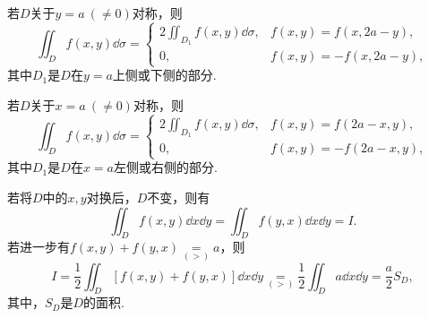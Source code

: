 若\(D\)关于\(y=a\ (\neq0)\)对称，则\begin{equation*}
	\iint_D f(x,y) \dd{\sigma}
	= \left\{ \begin{array}{cc}
		2 \iint_{D_1} f(x,y) \dd{\sigma}, & f(x,y) = f(x,2a-y), \\
		0, & f(x,y) = -f(x,2a-y),
	\end{array} \right.
\end{equation*}
其中\(D_1\)是\(D\)在\(y=a\)上侧或下侧的部分.

若\(D\)关于\(x=a\ (\neq0)\)对称，则\begin{equation*}
	\iint_D f(x,y) \dd{\sigma}
	= \left\{ \begin{array}{cc}
		2 \iint_{D_1} f(x,y) \dd{\sigma}, & f(x,y) = f(2a-x,y), \\
		0, & f(x,y) = -f(2a-x,y),
	\end{array} \right.
\end{equation*}
其中\(D_1\)是\(D\)在\(x=a\)左侧或右侧的部分.

\def\op{\underset{(>)}{=}}
若将\(D\)中的\(x,y\)对换后，\(D\)不变，则有\begin{equation*}
	\iint_D f(x,y) \dd{x}\dd{y} = \iint_D f(y,x) \dd{x}\dd{y} = I.
\end{equation*}
若进一步有\(f(x,y)+f(y,x) \op a\)，则\begin{equation*}
	I = \frac{1}{2} \iint_D [ f(x,y) + f(y,x) ] \dd{x}\dd{y}
	\op \frac{1}{2} \iint_D a \dd{x}\dd{y}
	= \frac{a}{2} S_D,
\end{equation*}
其中，\(S_D\)是\(D\)的面积.
\endgroup

